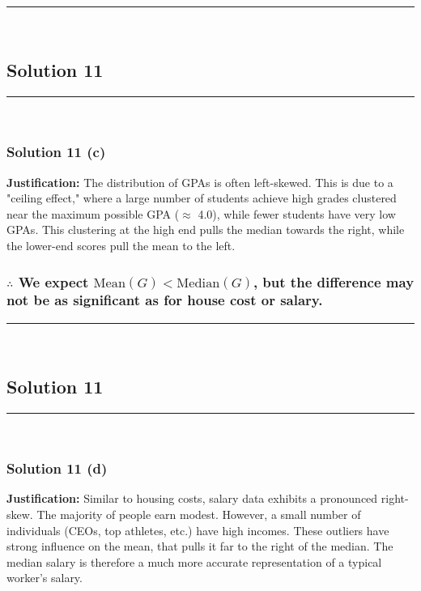 \documentclass{article}
\begin{document}
\noindent\rule{\textwidth}{0.4pt}\\

\newpage

\subsection*{Solution 11}
\noindent\rule{\textwidth}{0.4pt}\\
\subsubsection*{Solution  11 (c)}

\parbox{\textwidth}{
    \textbf{Justification:} The distribution of GPAs is often left-skewed. This is due to a "ceiling effect," where a large number of students achieve high grades clustered near the maximum possible GPA ($\approx$ 4.0), while fewer students have very low GPAs. This clustering at the high end pulls the median towards the right, while the lower-end scores pull the mean to the left.
}

\subsubsection*{\normalfont $\therefore$ We expect $\text{Mean}(G) < \text{Median}(G)$, but the difference may not be as significant as for  house cost or salary.}

\noindent\rule{\textwidth}{0.4pt}\\

\newpage
\subsection*{Solution 11}
\noindent\rule{\textwidth}{0.4pt}\\
\subsubsection*{Solution  11 (d)}

\parbox{\textwidth}{
    \textbf{Justification:} Similar to housing costs, salary data exhibits a pronounced right-skew. The majority of people earn modest. However, a small number of individuals (CEOs, top athletes, etc.) have high incomes. These outliers have strong influence on the mean, that pulls it far to the right of the median. The median salary is therefore a much more accurate representation of a typical worker's salary.
}
\vspace{1em}
\end{document}
